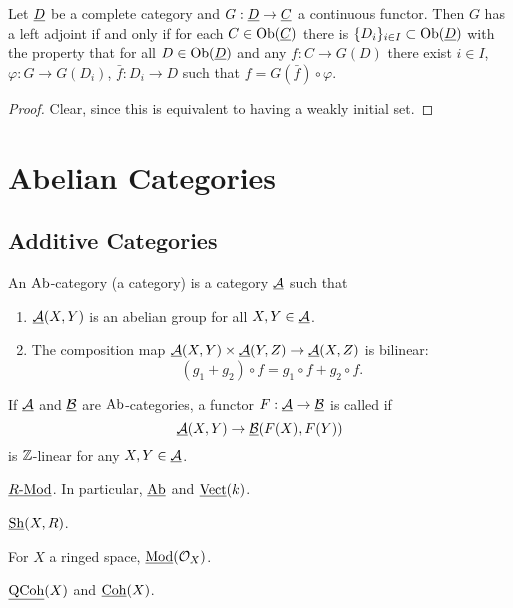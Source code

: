 \begin{theorem*}
	Let \( \underline{D} \) be a complete category and \( G: \underline{D} \to \underline{C} \) a continuous functor. Then \( G \) has a left adjoint if and only if for each \( C \in \operatorname{Ob}(\underline{C}) \) there is \( \{D_i\}_{i \in I} \subset \operatorname{Ob}(\underline{D}) \) with the property that for all \( D \in \operatorname{Ob}(\underline{D}) \) and any \( f: C \to G(D) \) there exist \( i \in I \), \( \varphi: G \to G(D_i) \), \( \bar{f}: D_i \to D \) such that \( f = G(\bar{f}) \circ \varphi \).
\end{theorem*}
\begin{proof}
	Clear, since this is equivalent to having a weakly initial set.
\end{proof}

\chapter{Abelian Categories}

\section{Additive Categories}

\begin{definitions*}
	\item An \( \mathrm{Ab} \)-category (a  category) is a category \( \underline{\mathcal{A}} \) such that
		\begin{enumerate}
			\item \( \underline{\mathcal{A}}(X, Y) \) is an abelian group for all \( X, Y \in \underline{\mathcal{A}} \).
			\item The composition map \( \underline{\mathcal{A}}(X, Y) \times \underline{\mathcal{A}}(Y, Z) \to \underline{\mathcal{A}}(X, Z) \) is bilinear:
				\[
					(g_1 + g_2) \circ f = g_1 \circ f + g_2 \circ f.
				\]
		\end{enumerate}
	\item If \( \underline{\mathcal{A}} \) and \( \underline{\mathcal{B}} \) are \( \mathrm{Ab} \)-categories, a functor \( F: \underline{\mathcal{A}} \to \underline{\mathcal{B}} \) is called  if
		\[
			\underline{\mathcal{A}}(X, Y) \to \underline{\mathcal{B}}(F(X), F(Y))
		\]
		is \( \mathbb{Z} \)-linear for any \( X, Y \in \underline{\mathcal{A}} \).
\end{definitions*}

\begin{examples*}
	\item \( \underline{R\text{-}\mathrm{Mod}} \). In particular, \( \underline{\mathrm{Ab}} \) and \( \underline{\mathrm{Vect}}(k) \).
	\item \( \underline{\mathrm{Sh}}(X, R) \).
	\item For \( X \) a ringed space, \( \underline{\mathrm{Mod}}(\mathcal{O}_X) \).
	\item \( \underline{\mathrm{QCoh}}(X) \) and \( \underline{\mathrm{Coh}}(X) \).
\end{examples*}


